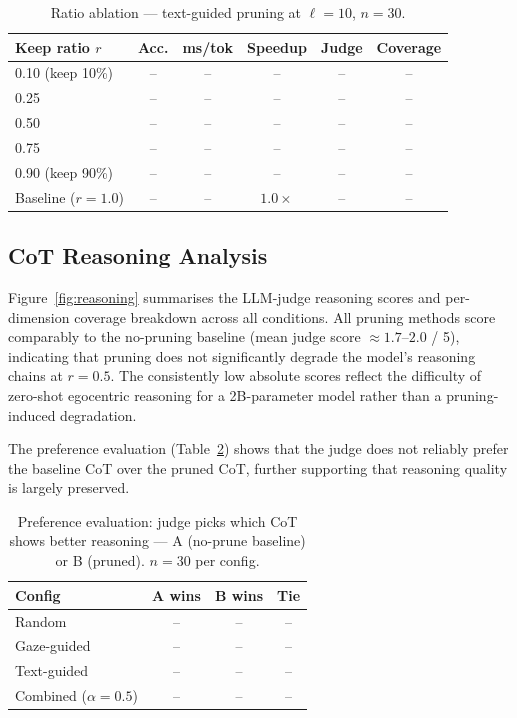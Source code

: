 \begin{table}[h]
\centering
\caption{Ratio ablation — text-guided pruning at $\ell=10$, $n=30$.}
\label{tab:ratio}
\small
\begin{tabular}{lccccc}
\toprule
\textbf{Keep ratio $r$} & \textbf{Acc.} & \textbf{ms/tok} & \textbf{Speedup}
  & \textbf{Judge} & \textbf{Coverage} \\
\midrule
0.10 (keep 10\%) & -- & -- & -- & -- & -- \\
0.25             & -- & -- & -- & -- & -- \\
0.50             & -- & -- & -- & -- & -- \\
0.75             & -- & -- & -- & -- & -- \\
0.90 (keep 90\%) & -- & -- & -- & -- & -- \\
\hline
Baseline ($r=1.0$) & -- & -- & $1.0\times$ & -- & -- \\
\bottomrule
\end{tabular}
\end{table}

\subsection{CoT Reasoning Analysis}

Figure~\ref{fig:reasoning} summarises the LLM-judge reasoning scores and
per-dimension coverage breakdown across all conditions.
All pruning methods score comparably to the no-pruning baseline
(mean judge score $\approx 1.7$--$2.0$ / 5), indicating that pruning
does not significantly degrade the model's reasoning chains at $r = 0.5$.
The consistently low absolute scores reflect the difficulty of
zero-shot egocentric reasoning for a 2B-parameter model rather than
a pruning-induced degradation.

The preference evaluation (Table~\ref{tab:preference}) shows that
the judge does not reliably prefer the baseline CoT over the pruned
CoT, further supporting that reasoning quality is largely preserved.

\begin{table}[h]
\centering
\caption{Preference evaluation: judge picks which CoT shows better
reasoning — A (no-prune baseline) or B (pruned). $n=30$ per config.}
\label{tab:preference}
\small
\begin{tabular}{lccc}
\toprule
\textbf{Config} & \textbf{A wins} & \textbf{B wins} & \textbf{Tie} \\
\midrule
Random           & -- & -- & -- \\
Gaze-guided      & -- & -- & -- \\
Text-guided      & -- & -- & -- \\
Combined ($\alpha=0.5$) & -- & -- & -- \\
\bottomrule
\end{tabular}
\end{table}

